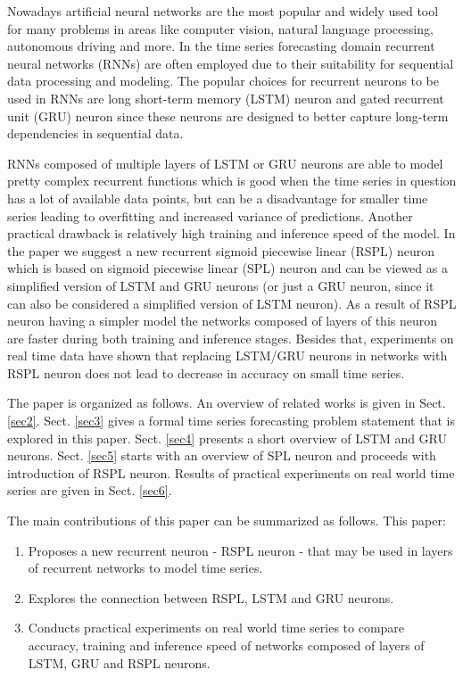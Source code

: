 \documentclass[sn-apa]{sn-jnl}%
\begin{document}
Nowadays artificial neural networks are the most popular and widely used tool for many problems in areas like computer vision, natural language processing, autonomous driving and more. In the time series forecasting domain recurrent neural networks (RNNs) are often employed \citep{hewamalage2021recurrent} due to their suitability for sequential data processing and modeling. The popular choices for recurrent neurons to be used in RNNs are long short-term memory (LSTM) neuron \citep{hochreiter1997long} and gated recurrent unit (GRU) neuron \citep{cho2014learning} since these neurons are designed to better capture long-term dependencies in sequential data.

RNNs composed of multiple layers of LSTM or GRU neurons are able to model pretty complex recurrent functions which is good when the time series in question has a lot of available data points, but can be a disadvantage for smaller time series leading to overfitting and increased variance of predictions. Another practical drawback is relatively high training and inference speed of the model. In the paper we suggest a new recurrent sigmoid piecewise linear (RSPL) neuron which is based on sigmoid piecewise linear (SPL) neuron \citep{zgurovsky2018structural} and can be viewed as a simplified version of LSTM and GRU neurons (or just a GRU neuron, since it can also be considered a simplified version of LSTM neuron). As a result of RSPL neuron having a simpler model the networks composed of layers of this neuron are faster during both training and inference stages. Besides that, experiments on real time data have shown that replacing LSTM/GRU neurons in networks with RSPL neuron does not lead to decrease in accuracy on small time series.

The paper is organized as follows. An overview of related works is given in Sect. \ref{sec2}. Sect. \ref{sec3} gives a formal time series forecasting problem statement that is explored in this paper. Sect. \ref{sec4} presents a short overview of LSTM and GRU neurons. Sect. \ref{sec5} starts with an overview of SPL neuron and proceeds with introduction of RSPL neuron. Results of practical experiments on real world time series are given in Sect. \ref{sec6}.

The main contributions of this paper can be summarized as follows. This paper:
\begin{enumerate}
\item Proposes a new recurrent neuron - RSPL neuron - that may be used in layers of recurrent networks to model time series.
\item Explores the connection between RSPL, LSTM and GRU neurons.
\item Conducts practical experiments on real world time series to compare accuracy, training and inference speed of networks composed of layers of LSTM, GRU and RSPL neurons.  
\end{enumerate}
\end{document}
